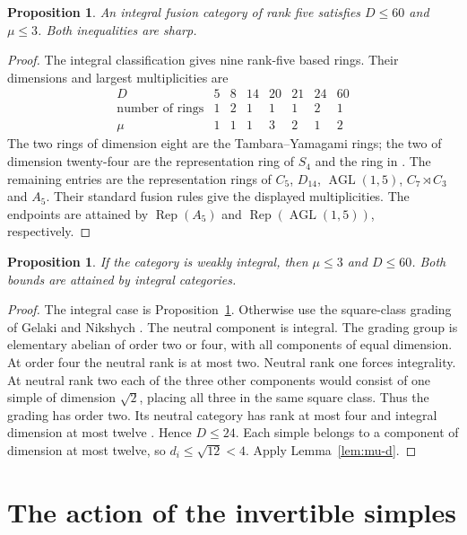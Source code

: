 \documentclass[11pt,a4paper]{article}
\newtheorem{proposition}[theorem]{Proposition}
\numberwithin{equation}{section}
\begin{document}
\begin{proposition}\label{prop:integral-five}
An integral fusion category of rank five satisfies $D\le60$ and
$\mu\le3$. Both inequalities are sharp.
\end{proposition}
\begin{proof}
The integral classification \cite[Theorem~1.1]{ABDP} gives nine
rank-five based rings. Their dimensions and largest multiplicities are
\[
\begin{array}{c|rrrrrrr}
 D&5&8&14&20&21&24&60\\\hline
 \text{number of rings}&1&2&1&1&1&2&1\\
 \mu&1&1&1&3&2&1&2
\end{array}
\]
The two rings of dimension eight are the Tambara--Yamagami rings;
the two of dimension twenty-four are the representation ring of
$S_4$ and the ring in \cite[\S3.5, no.~11]{LPR}.
The remaining entries are the representation rings of $C_5$,
$D_{14}$, $\operatorname{AGL}(1,5)$, $C_7\rtimes C_3$ and $A_5$.
Their standard fusion rules give the displayed multiplicities.
The endpoints are attained by $\operatorname{Rep}(A_5)$ and
$\operatorname{Rep}(\operatorname{AGL}(1,5))$, respectively.
\end{proof}


\begin{proposition}\label{prop:weak-five}
If the category is weakly integral, then $\mu\le3$ and $D\le60$. Both bounds are attained by integral categories.
\end{proposition}
\begin{proof}
The integral case is Proposition~\ref{prop:integral-five}. Otherwise use the square-class grading of Gelaki and Nikshych
\cite[Theorem~3.10]{GN}. The neutral component is integral. The grading group is elementary abelian of order two or four, with all components of equal dimension. At order four the neutral rank is at most two. Neutral rank one forces integrality. At neutral rank two each of the three other components would consist of one simple of dimension $\sqrt2$, placing all three in the same square class. Thus the grading has order two. Its neutral category has rank at most four and integral dimension at most twelve \cite{ABDP}. Hence $D\le24$. Each simple belongs to a component of dimension at most twelve, so $d_i\le\sqrt{12}<4$. Apply Lemma~\ref{lem:mu-d}.
\end{proof}


\section{The action of the invertible simples}
\end{document}

